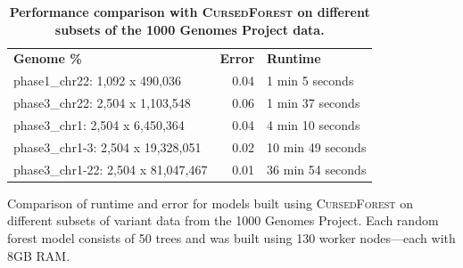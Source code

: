 \documentclass[10pt,letterpaper]{article}
\newlength\savedwidth
\newcommand\thickhline{\noalign{\global\savedwidth\arrayrulewidth\global\arrayrulewidth 2pt}%
\hline
\noalign{\global\arrayrulewidth\savedwidth}}
\newcommand{\cursedforest}{\textsc{CursedForest}\xspace}
\begin{document}
\begin{table}[!ht]
\begin{minipage}{\textwidth}
\centering
\caption{ {\bf Performance comparison with \cursedforest on different subsets of the 1000 Genomes Project data.}}
\begin{tabular}{| l | r | l |}
\hline
{\bf Genome \%} & {\bf Error} & {\bf Runtime} \\ \thickhline
phase1\_chr22: 1,092 x 490,036 & 0.04 & 1 min 5 seconds \\ \hline
phase3\_chr22: 2,504 x 1,103,548 & 0.06 & 1 min 37 seconds \\ \hline
phase3\_chr1: 2,504 x 6,450,364 & 0.04 & 4 min 10 seconds \\ \hline
phase3\_chr1-3: 2,504 x 19,328,051 & 0.02 & 10 min 49 seconds \\ \hline
phase3\_chr1-22: 2,504 x 81,047,467 & 0.01 & 36 min 54 seconds \\ \hline
\end{tabular}
\begin{flushleft} 
Comparison of runtime and error for models built using \cursedforest on different subsets of variant data 
from the 1000 Genomes Project.
Each random forest model consists of 50 trees and was built using 130 worker nodes---each with 8GB RAM.
\end{flushleft}
\label{cursedforesttable}
\end{minipage}
\end{table}
\end{document}
